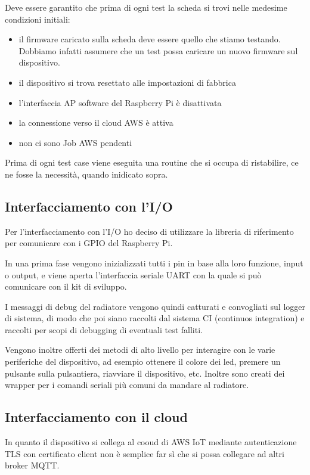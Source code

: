 \documentclass[12pt,a4paper,twoside,titlepage]{book}
\begin{document}
Deve essere garantito che prima di ogni test la scheda si trovi nelle medesime
condizioni initiali:

\begin{itemize}
    \item il firmware caricato sulla scheda deve essere quello che stiamo testando.
        Dobbiamo infatti assumere che un test possa caricare un nuovo firmware sul
        dispositivo.
    \item il dispositivo si trova resettato alle impostazioni di fabbrica
    \item l'interfaccia AP software del Raspberry Pi è disattivata
    \item la connessione verso il cloud AWS è attiva
    \item non ci sono Job AWS pendenti
\end{itemize}

Prima di ogni test case viene eseguita una routine che si occupa di ristabilire,
ce ne fosse la necessità, quando inidicato sopra.

\subsection{Interfacciamento con l'I/O}

Per l'interfacciamento con l'I/O ho deciso di utilizzare la libreria di riferimento
per comunicare con i GPIO del Raspberry Pi.

In una prima fase vengono inizializzati tutti i pin in base alla loro funzione, input
o output, e viene aperta l'interfaccia seriale UART con la quale si può comunicare con
il kit di sviluppo.

I messaggi di debug del radiatore vengono quindi catturati e convogliati sul logger
di sistema, di modo che poi siano raccolti dal sistema CI (continuos integration)
e raccolti per scopi di debugging di eventuali test falliti.

Vengono inoltre offerti dei metodi di alto livello per interagire con le varie
periferiche del dispositivo, ad esempio ottenere il colore dei led, premere un
pulsante sulla pulsantiera, riavviare il dispositivo, etc.
Inoltre sono creati dei wrapper per i comandi seriali più comuni da mandare al
radiatore.

\subsection{Interfacciamento con il cloud}

In quanto il dispositivo si collega al cooud di AWS IoT mediante autenticazione
TLS con certificato client non è semplice far sì che si possa collegare ad altri
broker MQTT.
\end{document}
